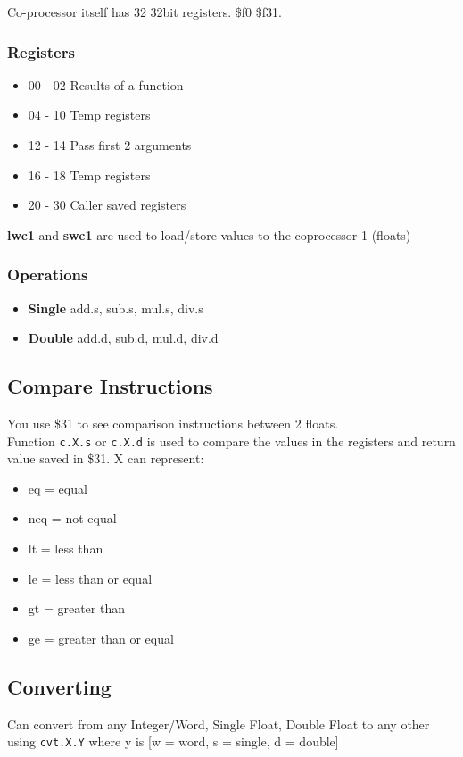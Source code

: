\documentclass{article}
\newcommand\tab[1][0.5cm]{\hspace*{#1}}
\begin{document}
		Co-processor itself has 32 32bit registers. \$f0 \$f31.

		\subsubsection*{Registers}
		\begin{itemize}
			\item 00 - 02 \tab Results of a function
			\item 04 - 10 \tab Temp registers
			\item 12 - 14 \tab Pass first 2 arguments
			\item 16 - 18 \tab Temp registers
			\item 20 - 30 \tab Caller saved registers
		\end{itemize}

		\textbf{lwc1} and \textbf{swc1} are used to load/store values to the coprocessor 1 (floats)

		\subsubsection*{Operations}
		\begin{itemize}
			\item \textbf{Single} \tab add.s, sub.s, mul.s, div.s
			\item \textbf{Double} \tab add.d, sub.d, mul.d, div.d
		\end{itemize}

	\subsection*{Compare Instructions}
		You use \$31 to see comparison instructions between 2 floats.\\

		Function \texttt{c.X.s} or \texttt{c.X.d} is used to compare the values in the registers and return value saved in \$31. X can represent:
		\begin{itemize}
			\item eq = equal
			\item neq = not equal
			\item lt = less than
			\item le = less than or equal
			\item gt = greater than
			\item ge = greater than or equal
		\end{itemize}

	\subsection*{Converting}
		Can convert from any Integer/Word, Single Float, Double Float to any other using \texttt{cvt.X.Y} where y is [w = word, s = single, d = double]
\end{document}
